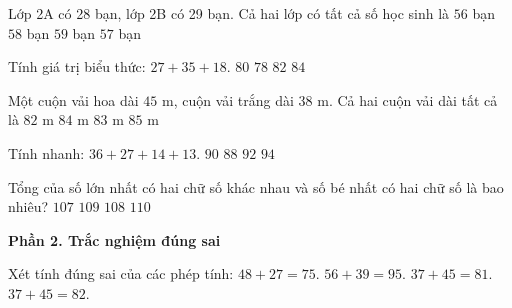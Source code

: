 \begin{ex} %
Lớp 2A có 28 bạn, lớp 2B có 29 bạn. Cả hai lớp có tất cả số học sinh là
\choice
{$56$ bạn}
{$58$ bạn}
{$59$ bạn}
{\True $57$ bạn}
\end{ex}

\begin{ex} %
Tính giá trị biểu thức: $27 + 35 + 18$.
\choice
{\True $80$}
{$78$}
{$82$}
{$84$}
\end{ex}

\begin{ex} %
Một cuộn vải hoa dài $45\text{ m}$, cuộn vải trắng dài $38\text{ m}$. Cả hai cuộn vải dài tất cả là
\choice
{$82\text{ m}$}
{$84\text{ m}$}
{\True $83\text{ m}$}
{$85\text{ m}$}
\end{ex}

\begin{ex} %
Tính nhanh: $36 + 27 + 14 + 13$.
\choice
{\True $90$}
{$88$}
{$92$}
{$94$}
\end{ex}

\begin{ex} %
Tổng của số lớn nhất có hai chữ số khác nhau và số bé nhất có hai chữ số là bao nhiêu?
\choice
{$107$}
{$109$}
{\True $108$}
{$110$}
\end{ex}

\textbf{Phần 2. Trắc nghiệm đúng sai}

\begin{ex} %
Xét tính đúng sai của các phép tính:
\choiceTF
{\True $48 + 27 = 75$.}
{\True $56 + 39 = 95$.}
{$37 + 45 = 81$.}
{\True $37 + 45 = 82$.}
\end{ex}

